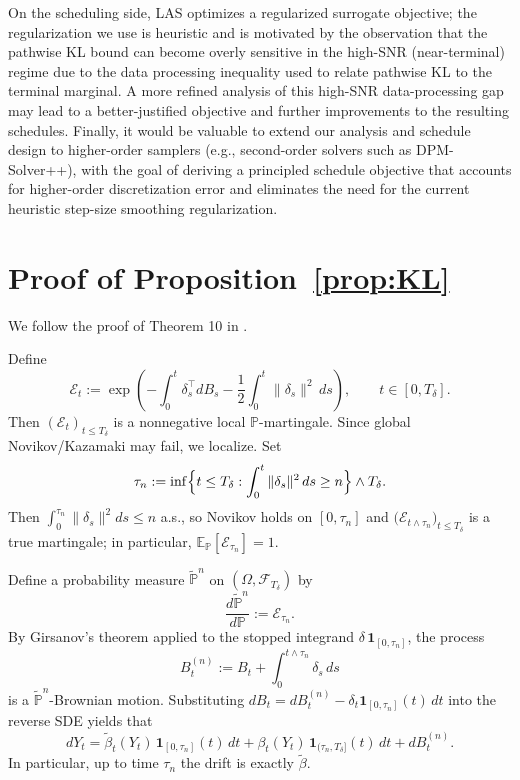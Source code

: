 \documentclass[11pt]{article}
\theoremstyle{definition}
\numberwithin{equation}{section}
\begin{document}
On the scheduling side, LAS optimizes a regularized surrogate objective; the regularization we use is heuristic
and is motivated by the observation that the pathwise KL bound can become overly sensitive in the high-SNR (near-terminal) regime due to the data processing inequality used to relate pathwise KL to the terminal marginal.
A more refined analysis of this high-SNR data-processing gap may lead to a better-justified objective and further improvements to the resulting schedules. 
Finally, it would be valuable to extend our analysis and schedule design to higher-order samplers (e.g., second-order solvers such as DPM-Solver++), with the goal of deriving a principled schedule objective that accounts for higher-order discretization error and eliminates the need for the current heuristic step-size smoothing regularization.




\printbibliography

\newpage
\appendix
\onecolumn


\section{Proof of Proposition~\ref{prop:KL}}

We follow the proof of Theorem 10 in \cite{chen2023sampling}.

Define
\[
\mathcal E_t
:=\exp\!\left(-\int_0^t \delta_s^\top dB_s - \frac12\int_0^t \|\delta_s\|^2\,ds\right),\qquad t\in[0,T_\delta].
\]
Then $(\mathcal E_t)_{t\le T_\delta}$ is a nonnegative local $\mathbb P$-martingale.
Since global Novikov/Kazamaki may fail, we localize. Set
\[
\tau_n:=\inf\Bigl\{t\le T_\delta:\int_0^t \|\delta_s\|^2\,ds\ge n\Bigr\}\wedge T_\delta.
\]
Then $\int_0^{\tau_n}\|\delta_s\|^2ds\le n$ a.s., so Novikov holds on $[0,\tau_n]$ and
$\bigl(\mathcal E_{t\wedge\tau_n}\bigr)_{t\le T_\delta}$ is a true martingale; in particular,
\(
\mathbb E_{\mathbb P}[\mathcal E_{\tau_n}]=1.
\)

Define a probability measure $\tilde{\mathbb P}^n$ on $(\Omega,\mathcal F_{T_\delta})$ by
\[
\frac{d\tilde{\mathbb P}^n}{d\mathbb P}:=\mathcal E_{\tau_n}.
\]
By Girsanov's theorem applied to the stopped integrand $\delta\,\mathbf 1_{[0,\tau_n]}$, the process
\[
B^{(n)}_t:=B_t+\int_0^{t\wedge\tau_n}\delta_s\,ds
\]
is a $\tilde{\mathbb P}^n$-Brownian motion. Substituting $dB_t=dB^{(n)}_t-\delta_t\mathbf 1_{[0,\tau_n]}(t)\,dt$
into the reverse SDE yields that
\begin{equation*}%
dY_t=\tilde\beta_t(Y_t)\,\mathbf 1_{[0,\tau_n]}(t)\,dt+\beta_t(Y_t)\,\mathbf 1_{(\tau_n,T_\delta]}(t)\,dt+dB^{(n)}_t.
\end{equation*}
In particular, up to time $\tau_n$ the drift is exactly $\tilde\beta$.
\end{document}
